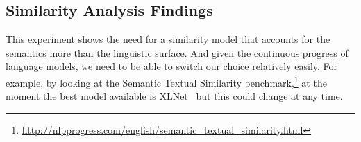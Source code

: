 \subsection{\statusgreen Similarity Analysis Findings}
\label{ssec:cgs_similarity_conclusion}

This experiment shows the need for a similarity model that accounts for the semantics more than the linguistic surface. And given the continuous progress of language models, we need to be able to switch our choice relatively easily.
For example, by looking at the Semantic Textual Similarity benchmark,\footnote{\url{http://nlpprogress.com/english/semantic_textual_similarity.html}} at the moment the best model available is XLNet~\citep{yang2019xlnet} but this could change at any time.

